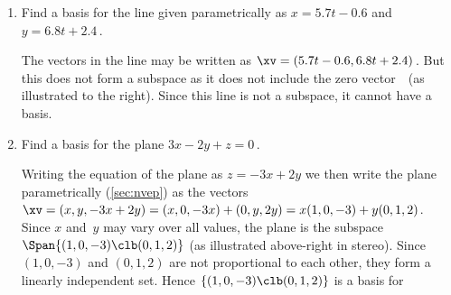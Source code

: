 \begin{example}
\begin{enumerate}
\item 
\begin{figbox}{}%
Find a basis for the line given parametrically as \(x=5.7t-0.6\) and \(y=6.8t+2.4\)\,.

\begin{solution} 
The vectors in the line may be written as \(\xv=(5.7t-0.6,6.8t+2.4)\)\,.
But this does not form a subspace as it does not include the zero vector~\ov\ (as illustrated to the right). 
Since this line is not a subspace, it cannot have a basis.


\end{solution}
\end{figbox}




\item 
\begin{figbox}{ {}}%
Find a basis for the plane \(3x-2y+z=0\)\,.

\begin{solution} 
Writing the equation of the plane as \(z=-3x+2y\) we then write the plane parametrically (\cref{sec:nvep}) as the vectors \(\xv=(x,y,-3x+2y) =(x,0,-3x)+(0,y,2y) =x(1,0,-3) +y(0,1,2)\).
Since \(x\) and~\(y\) may vary over all values, the plane is the subspace \(\Span\{(1,0,-3)\clb (0,1,2)\}\) (as illustrated above-right in stereo).
Since \((1,0,-3)\) and \((0,1,2)\) are not proportional to each other, they form a linearly independent set.
Hence \(\{(1,0,-3)\clb (0,1,2)\}\) is a basis for 


\end{solution}
\end{figbox}
\end{enumerate}
\end{example}
